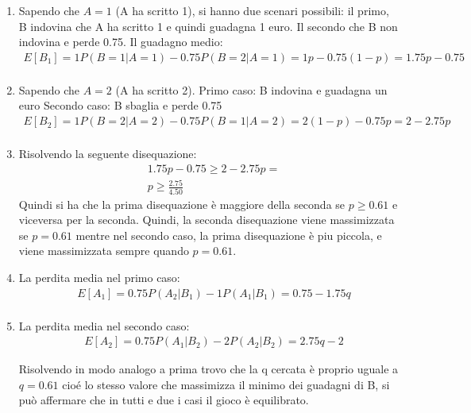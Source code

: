 \documentclass[12pt]{article}
\begin{document}
\begin{enumerate}
    \item Sapendo che \(A = 1\) (A ha scritto 1), si hanno due scenari possibili:
    il primo, B indovina che A ha scritto 1 e quindi guadagna 1 euro. \newline
    Il secondo che B non indovina e perde 0.75. \newline
    Il guadagno medio:
    \begin{align*}
        E[B_1] = 1P(B=1|A=1)-0.75P(B=2|A=1) = 1p-0.75(1-p) = 1.75p-0.75 \\
    \end{align*}
    \item Sapendo che \(A = 2\) (A ha scritto 2).
    Primo caso: B indovina e guadagna un euro
    Secondo caso: B sbaglia e perde 0.75
    \begin{align*}
        E[B_2] = 1P(B=2|A=2)-0.75P(B=1|A=2) = 2(1-p)-0.75p = 2-2.75p \\
    \end{align*}
    \item Risolvendo la seguente disequazione:
    \begin{align*}
        &1.75p-0.75 \ge 2-2.75p =\\
        &p \ge \frac{2.75}{4.50}
    \end{align*}
    Quindi si ha che la prima disequazione è maggiore della seconda se \(p \ge 0.61\) e viceversa per la seconda. 
    Quindi, la seconda disequazione viene massimizzata se \(p = 0.61\) mentre nel secondo caso, la prima disequazione è piu piccola,
    e viene massimizzata sempre quando \(p = 0.61\).
    \item La perdita media nel primo caso:
    \begin{align*}
        &E[A_1] = 0.75P(A_2|B_1) -1P(A_1|B_1) = 0.75-1.75q \\
    \end{align*}
    \item La perdita media nel secondo caso:
    \begin{align*}
        &E[A_2]= 0.75P(A_1|B_2) -2P(A_2|B_2) = 2.75q-2
    \end{align*}

    Risolvendo in modo analogo a prima trovo che la q cercata è proprio uguale a \(q = 0.61\)
    cioé lo stesso valore che massimizza il minimo dei guadagni di B, si può affermare che in tutti
    e due i casi il gioco è equilibrato. 
\end{enumerate}
\end{document}

